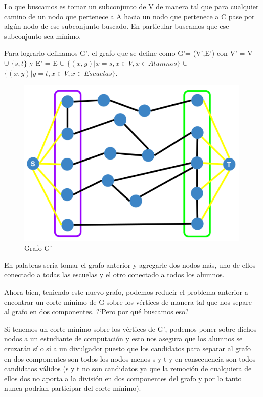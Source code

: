 Lo que buscamos es tomar un subconjunto de V de manera tal que para cualquier camino de un nodo que pertenece a A hacia un nodo que pertenece a C pase por algún nodo de ese subconjunto buscado. En particular buscamos que ese subconjunto sea mínimo.

Para lograrlo definamos G', el grafo que se define como G'= (V',E') con V' = V $\cup$ $\{s,t\}$ y E' = E $\cup$ $\{(x,y)| x = s, x \in V , x \in Alumnos \}$ $\cup$ $\{(x,y)| y = t, x \in V , x \in Escuelas \}$.

\begin{figure}[h!]
  \centering
    \includegraphics[scale = 0.225]{img/gprima.png}
    \caption{Grafo G'}
\end{figure}

En palabras sería tomar el grafo anterior y agregarle dos nodos más, uno de ellos conectado a todas las escuelas y el otro conectado a todos los alumnos.

Ahora bien, teniendo este nuevo grafo, podemos reducir el problema anterior a encontrar un corte mínimo de G sobre los vértices de manera tal que nos separe al grafo en dos componentes. ?`Pero por qué buscamos eso?

Si tenemos un corte mínimo sobre los vértices de G', podemos poner sobre dichos nodos a un estudiante de computación y esto nos asegura que los alumnos se cruzarán sí o sí a un divulgador puesto que los candidatos para separar al grafo en dos componentes son todos los nodos menos s y t y en consecuencia son todos candidatos válidos (s y t no son candidatos ya que la remoción de cualquiera de ellos dos no aporta a la división en dos componentes del grafo y por lo tanto nunca podrían participar del corte mínimo). 

